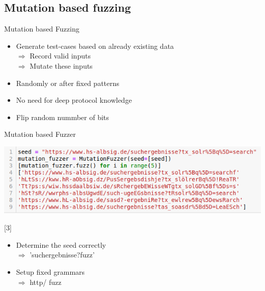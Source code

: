 \documentclass{beamer}
\begin{document}
\subsection{Mutation based fuzzing}
\begin{frame}{Mutation based Fuzzing}
\begin{itemize}
 \item Generate test-cases based on already existing data\\
 $\Rightarrow$ Record valid inputs\\
 $\Rightarrow$ Mutate these inputs
 \item Randomly or after fixed patterns
 \item No need for deep protocol knowledge
 \item Flip random nummber of bits
 
 
\end{itemize}
\end{frame}
\begin{frame}{Mutation based Fuzzer}
\vspace{15mm}
\begin{center}
 \includegraphics[scale=0.5]{mutatate.png}

\end{center}

\vspace{25mm}
\small{[3]}
\end{frame}
\begin{frame}
 \begin{itemize}
 \item Determine the seed correctly\\
 $\Rightarrow$ 'suchergebnisse?fuzz'
  \item Setup fixed grammars\\
  $\Rightarrow$ http/
  fuzz
 \end{itemize}
 
\end{frame}
\end{document}
